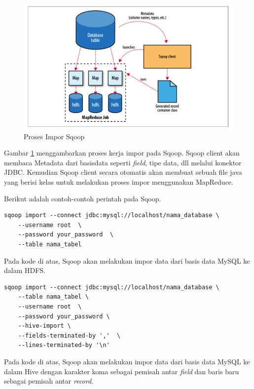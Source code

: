 \begin{figure}
	\centering
	\includegraphics[scale=0.5]{Gambar/sqoop-import.png}
	\caption[Proses Impor Sqoop]{Proses Impor Sqoop} 
	\label{fig:sqoop_import}
\end{figure}

Gambar \ref{fig:sqoop_import} menggambarkan proses kerja impor pada Sqoop. Sqoop client akan membaca Metadata dari basisdata seperti \textit{field}, tipe data, dll melalui konektor JDBC. Kemudian Sqoop client secara otomatis akan membuat sebuah file java yang berisi kelas untuk melakukan proses impor menggunakan MapReduce. 

Berikut adalah contoh-contoh perintah pada Sqoop.

\begin{lstlisting}[caption=Perintah Impor Sqoop dari Basis Data MySQL ke HDFS]
	sqoop import --connect jdbc:mysql://localhost/nama_database \
	--username root  \
	--password your_password  \
	--table nama_tabel 
\end{lstlisting}

Pada kode di atas, Sqoop akan melakukan impor data dari basis data MySQL ke dalam HDFS.

\begin{lstlisting}[caption=Perintah Impor Sqoop dari Basis Data MySQL ke Hive]
	sqoop import --connect jdbc:mysql://localhost/nama_database \
	--table nama_tabel \ 
	--username root  \
	--password your_password \
	--hive-import \
	--fields-terminated-by ','  \
	--lines-terminated-by '\n'
\end{lstlisting}

Pada kode di atas, Sqoop akan melakukan impor data dari basis data MySQL ke dalam Hive dengan karakter koma sebagai pemisah antar \textit{field} dan baris baru sebagai pemisah antar \textit{record}.

